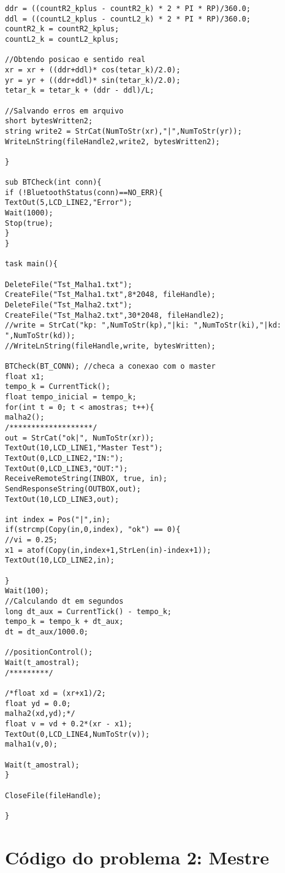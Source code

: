 \begin{apendicesenv}
\begin{lstlisting}
ddr = ((countR2_kplus - countR2_k) * 2 * PI * RP)/360.0;
ddl = ((countL2_kplus - countL2_k) * 2 * PI * RP)/360.0;
countR2_k = countR2_kplus;
countL2_k = countL2_kplus;

//Obtendo posicao e sentido real
xr = xr + ((ddr+ddl)* cos(tetar_k)/2.0);
yr = yr + ((ddr+ddl)* sin(tetar_k)/2.0);
tetar_k = tetar_k + (ddr - ddl)/L;

//Salvando erros em arquivo
short bytesWritten2;
string write2 = StrCat(NumToStr(xr),"|",NumToStr(yr));
WriteLnString(fileHandle2,write2, bytesWritten2);

}

sub BTCheck(int conn){
if (!BluetoothStatus(conn)==NO_ERR){
TextOut(5,LCD_LINE2,"Error");
Wait(1000);
Stop(true);
}
}

task main(){

DeleteFile("Tst_Malha1.txt");
CreateFile("Tst_Malha1.txt",8*2048, fileHandle);
DeleteFile("Tst_Malha2.txt");
CreateFile("Tst_Malha2.txt",30*2048, fileHandle2);
//write = StrCat("kp: ",NumToStr(kp),"|ki: ",NumToStr(ki),"|kd: ",NumToStr(kd));
//WriteLnString(fileHandle,write, bytesWritten);

BTCheck(BT_CONN); //checa a conexao com o master
float x1;
tempo_k = CurrentTick();
float tempo_inicial = tempo_k;
for(int t = 0; t < amostras; t++){
malha2();
/*******************/
out = StrCat("ok|", NumToStr(xr));
TextOut(10,LCD_LINE1,"Master Test");
TextOut(0,LCD_LINE2,"IN:");
TextOut(0,LCD_LINE3,"OUT:");
ReceiveRemoteString(INBOX, true, in);
SendResponseString(OUTBOX,out);
TextOut(10,LCD_LINE3,out);

int index = Pos("|",in);
if(strcmp(Copy(in,0,index), "ok") == 0){
//vi = 0.25;
x1 = atof(Copy(in,index+1,StrLen(in)-index+1));
TextOut(10,LCD_LINE2,in);

}
Wait(100);
//Calculando dt em segundos
long dt_aux = CurrentTick() - tempo_k;
tempo_k = tempo_k + dt_aux;
dt = dt_aux/1000.0;

//positionControl();
Wait(t_amostral);
/*********/

/*float xd = (xr+x1)/2;
float yd = 0.0;
malha2(xd,yd);*/
float v = vd + 0.2*(xr - x1);
TextOut(0,LCD_LINE4,NumToStr(v));
malha1(v,0);

Wait(t_amostral);
}

CloseFile(fileHandle);

}
\end{lstlisting}

\chapter{Código do problema 2: Mestre}
\label{chap:codP2Mestre}


\end{apendicesenv}
